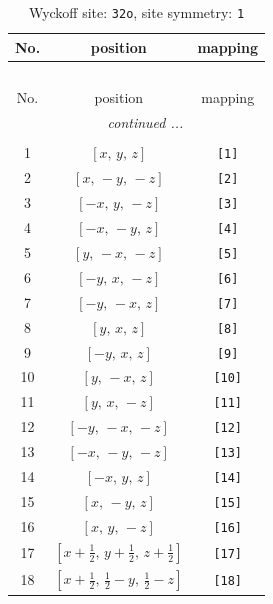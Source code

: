 \documentclass[fleqn,8pt]{jsarticle}
\begin{document}
\renewcommand{\arraystretch}{1.2}
\begin{longtable}{ccc}
\caption{Wyckoff site: {\tt 32o}, site symmetry: {\tt 1}}
 \\
 \hline \hline
No. & position & mapping \\ \hline \endfirsthead

\multicolumn{2}{l}{\tablename\ \thetable{}} \\
 \hline \hline
No. & position & mapping \\ \hline \endhead

 \hline \hline
\multicolumn{2}{r}{\footnotesize\it continued ...} \\ \endfoot

 \hline \hline
\multicolumn{2}{r}{} \\ \endlastfoot

1 & $\left[ x,\, y,\, z \right]$ & {\tt [1]} \\ \hline
2 & $\left[ x,\, - y,\, - z \right]$ & {\tt [2]} \\ \hline
3 & $\left[ - x,\, y,\, - z \right]$ & {\tt [3]} \\ \hline
4 & $\left[ - x,\, - y,\, z \right]$ & {\tt [4]} \\ \hline
5 & $\left[ y,\, - x,\, - z \right]$ & {\tt [5]} \\ \hline
6 & $\left[ - y,\, x,\, - z \right]$ & {\tt [6]} \\ \hline
7 & $\left[ - y,\, - x,\, z \right]$ & {\tt [7]} \\ \hline
8 & $\left[ y,\, x,\, z \right]$ & {\tt [8]} \\ \hline
9 & $\left[ - y,\, x,\, z \right]$ & {\tt [9]} \\ \hline
10 & $\left[ y,\, - x,\, z \right]$ & {\tt [10]} \\ \hline
11 & $\left[ y,\, x,\, - z \right]$ & {\tt [11]} \\ \hline
12 & $\left[ - y,\, - x,\, - z \right]$ & {\tt [12]} \\ \hline
13 & $\left[ - x,\, - y,\, - z \right]$ & {\tt [13]} \\ \hline
14 & $\left[ - x,\, y,\, z \right]$ & {\tt [14]} \\ \hline
15 & $\left[ x,\, - y,\, z \right]$ & {\tt [15]} \\ \hline
16 & $\left[ x,\, y,\, - z \right]$ & {\tt [16]} \\ \hline
17 & $\left[ x + \frac{1}{2},\, y + \frac{1}{2},\, z + \frac{1}{2} \right]$ & {\tt [17]} \\ \hline
18 & $\left[ x + \frac{1}{2},\, \frac{1}{2} - y,\, \frac{1}{2} - z \right]$ & {\tt [18]} \\ \hline

\end{longtable}
\end{document}
